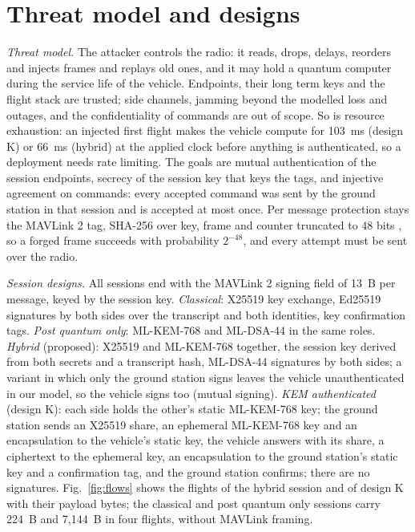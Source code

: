 \documentclass[conference]{IEEEtran}
\begin{document}
\section{Threat model and designs}
\label{sec:design}
\emph{Threat model.} The attacker controls the radio: it reads, drops, delays, reorders and injects frames and replays old ones, and it may hold a quantum computer during the service life of the vehicle. Endpoints, their long term keys and the flight stack are trusted; side channels, jamming beyond the modelled loss and outages, and the confidentiality of commands are out of scope. So is resource exhaustion: an injected first flight makes the vehicle compute for 103~ms (design K) or 66~ms (hybrid) at the applied clock before anything is authenticated, so a deployment needs rate limiting. The goals are mutual authentication of the session endpoints, secrecy of the session key that keys the tags, and injective agreement on commands: every accepted command was sent by the ground station in that session and is accepted at most once. Per message protection stays the MAVLink 2 tag, SHA-256 over key, frame and counter truncated to 48 bits \cite{mavsign}, so a forged frame succeeds with probability $2^{-48}$, and every attempt must be sent over the radio.

\emph{Session designs.} All sessions end with the MAVLink 2 signing field of 13~B per message, keyed by the session key. \emph{Classical}: X25519 key exchange, Ed25519 signatures by both sides over the transcript and both identities, key confirmation tags. \emph{Post quantum only}: ML-KEM-768 and ML-DSA-44 in the same roles. \emph{Hybrid} (proposed): X25519 and ML-KEM-768 together, the session key derived from both secrets and a transcript hash, ML-DSA-44 signatures by both sides; a variant in which only the ground station signs leaves the vehicle unauthenticated in our model, so the vehicle signs too (mutual signing). \emph{KEM authenticated} (design K): each side holds the other's static ML-KEM-768 key; the ground station sends an X25519 share, an ephemeral ML-KEM-768 key and an encapsulation to the vehicle's static key, the vehicle answers with its share, a ciphertext to the ephemeral key, an encapsulation to the ground station's static key and a confirmation tag, and the ground station confirms; there are no signatures. Fig.~\ref{fig:flows} shows the flights of the hybrid session and of design K with their payload bytes; the classical and post quantum only sessions carry 224~B and 7,144~B in four flights, without MAVLink framing.
\end{document}
